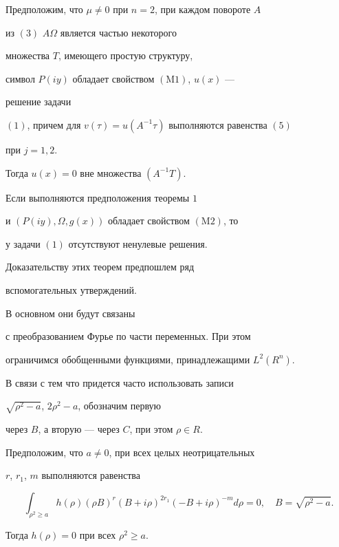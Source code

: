 \begin{thm}


Предположим, что $\mu\ne0$ при $n=2$, при каждом повороте $A$ 


из $(3)$ $A \Omega $ является частью некоторого


множества $T$, имеющего простую структуру, 


символ $P(iy)$ обладает свойством $(\mathrm M1)$, $u(x)$ ---


решение задачи


$(1)$, причем для $v(\tau)=u(A^{-1}\tau)$ выполняются равенства $(5)$


при $j=1, 2$.


Тогда $u(x)=0$ вне множества $(A^{-1}T)$.


\end{thm}





\begin{thm}


Если выполняются предположения теоремы $1$ 


и $(P(iy), \Omega, g(x))$ обладает свойством $(\mathrm M2)$, то


у задачи $(1)$ отсутствуют ненулевые решения.


\end{thm}





Доказательству этих теорем предпошлем ряд


вспомогательных утверждений. 


В основном они будут связаны


с преобразованием Фурье по части переменных. При этом


ограничимся обобщенными функциями, принадлежащими $ L^{2}(R^{n})$.





В связи с тем что придется часто использовать записи


$ \sqrt {\rho^{2}-a}$, $2\rho^{2}-a$, обозначим первую


через $B$, а вторую --- через $C$, при этом $\rho \in R$.





\begin{lem}


Предположим, что $a \ne 0$, при всех целых неотрицательных


$r$, $r_1$, $m$ выполняются равенства


\begin{equation}


\int_{\rho^{2} \ge a} h(\rho) (\rho B)^{r}


 (B+i\rho)^{2r_{1}} (-B+


i\rho)^{-m} d\rho=0,\quad B=\sqrt{\rho^2-a}. 


\end{equation}


Тогда $h(\rho)=0$ при всех $\rho^{2} \ge a$.


\end{lem}





